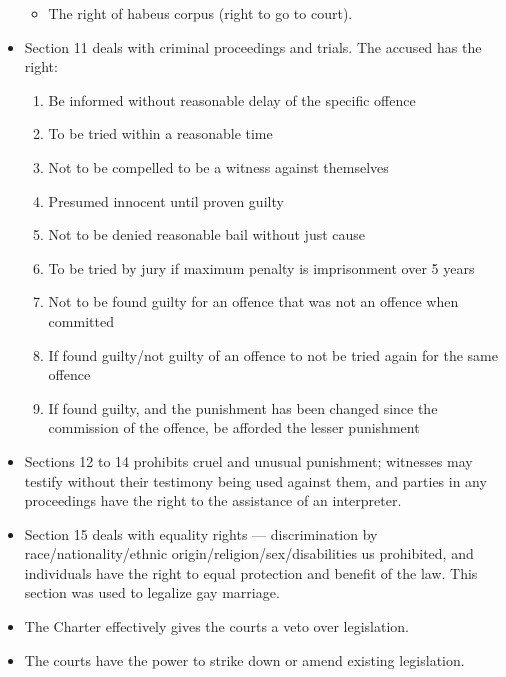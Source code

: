 \documentclass{article}
\begin{document}
\begin{itemize}
\begin{itemize}
            \item The right of habeus corpus (right to go to court).
        \end{itemize}
    \item Section 11 deals with criminal proceedings and trials.  The accused has the right:
        \begin{enumerate}
            \item Be informed without reasonable delay of the specific offence
            \item To be tried within a reasonable time
            \item Not to be compelled to be a witness against themselves
            \item Presumed innocent until proven guilty
            \item Not to be denied reasonable bail without just cause
            \item To be tried by jury if maximum penalty is imprisonment over 5 years
            \item Not to be found guilty for an offence that was not an offence when committed
            \item If found guilty/not guilty of an offence to not be tried again for the same offence
            \item If found guilty, and the punishment has been changed since the commission of the offence, be afforded the lesser punishment
        \end{enumerate}
    \item Sections 12 to 14 prohibits cruel and unusual punishment; witnesses may testify without their testimony being used against them, and parties in any proceedings have the right to the assistance of an interpreter.
    \item Section 15 deals with equality rights --- discrimination by race/nationality/ethnic origin/religion/sex/disabilities us prohibited, and individuals have the right to equal protection and benefit of the law.  This section was used to legalize gay marriage.
    \item The Charter effectively gives the courts a veto over legislation.
    \item The courts have the power to strike down or amend existing legislation.
\end{itemize}
\end{document}
